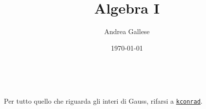 \documentclass[a4paper]{article}
\title{Algebra I}\let\Title\@title
\author{Andrea Gallese}\let\Author\@author
\date{\today}\let\Date\@date
\theoremstyle{remark}
\theoremstyle{definition}
\begin{document}

\begin{center}
	\vspace*{0,5 cm}
	{\Huge \textsf{\textbf{\Title}}} \\
	\vspace{0,75 cm}
	\textsc{\Author} \hspace{1cm} \textsc{\Date}
	\thispagestyle{empty}
	\vspace{0,7 cm}
\end{center}

\small

\tableofcontents

\bigskip
Per tutto quello che riguarda gli interi di Gauss, rifarsi a \href{http://www.math.uconn.edu/~kconrad/blurbs/ugradnumthy/Zinotes.pdf}{\texttt{kconrad}}.

\restoregeometry





\newpage
\listoftheorems[ignoreall,show={theorem}]
\end{document}
